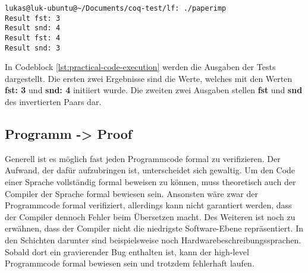 \begin{lstlisting}[language=coq,firstnumber=1,caption=Ocaml code ausführen,label=lst:practical-code-execution]
lukas@luk-ubuntu@~/Documents/coq-test/lf: ./paperimp
Result fst: 3 
Result snd: 4 
Result fst: 4 
Result snd: 3 
\end{lstlisting}
In Codeblock \ref{lst:practical-code-execution} werden die Ausgaben der Tests dargestellt. Die ersten zwei Ergebnisse sind die Werte, welches mit den Werten \textbf{fst: 3} und \textbf{snd: 4} initiiert wurde. Die zweiten zwei Ausgaben stellen \textbf{fst} und \textbf{snd} des invertierten Paars dar.

\subsection{Programm -> Proof}
Generell ist es möglich fast jeden Programmcode formal zu verifizieren. Der Aufwand, der dafür aufzubringen ist, unterscheidet sich gewaltig. Um den Code einer Sprache vollständig formal beweisen zu können, muss theoretisch auch der Compiler der Sprache formal bewiesen sein. Ansonsten wäre zwar der Programmcode formal verifiziert, allerdings kann nicht garantiert werden, dass der Compiler dennoch Fehler beim Übersetzen macht. Des Weiteren ist noch zu erwähnen, dass der Compiler nicht die niedrigste Software-Ebene repräsentiert. In den Schichten darunter sind beispielsweise noch Hardwarebeschreibungssprachen. Sobald dort ein gravierender Bug enthalten ist, kann der high-level Programmcode formal bewiesen sein und trotzdem fehlerhaft laufen.\\
\\
